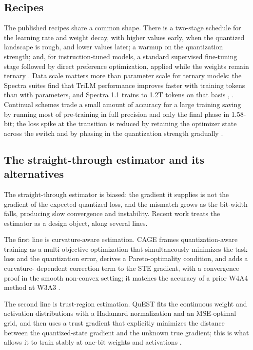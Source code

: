 \documentclass[11pt]{article}
\begin{document}
\subsection{Recipes}

The published recipes share a common shape. There is a two-stage schedule for the
learning rate and weight decay, with higher values early, when the quantized landscape
is rough, and lower values later; a warmup on the quantization strength; and, for
instruction-tuned models, a standard supervised fine-tuning stage followed by direct
preference optimization, applied while the weights remain ternary \cite{Ma2025-BitNet2B4T}.
Data scale matters more than parameter scale for ternary models: the Spectra suites
find that TriLM performance improves faster with training tokens than with parameters,
and Spectra 1.1 trains to 1.2T tokens on that basis \cite{Kaushal2024-Spectra},
\cite{Vaidhya2025-Spectra11}. Continual schemes trade a small amount of accuracy for a large
training saving by running most of pre-training in full precision and only the final
phase in 1.58-bit; the loss spike at the transition is reduced by retaining the
optimizer state across the switch and by phasing in the quantization strength gradually
\cite{Nielsen2025-ContinualQAT,Tu2025-Rethink1bitOpt}.

\subsection{The straight-through estimator and its alternatives}

The straight-through estimator is biased: the gradient it supplies is not the gradient
of the expected quantized loss, and the mismatch grows as the bit-width falls,
producing slow convergence and instability. Recent work treats the estimator as a
design object, along several lines.

The first line is curvature-aware estimation. CAGE frames quantization-aware training as
a multi-objective optimization that simultaneously minimizes the task loss and the
quantization error, derives a Pareto-optimality condition, and adds a curvature-
dependent correction term to the STE gradient, with a convergence proof in the smooth
non-convex setting; it matches the accuracy of a prior W4A4 method at W3A3
\cite{Tabesh2025-CAGE}.

The second line is trust-region estimation. QuEST fits the continuous weight and
activation distributions with a Hadamard normalization and an MSE-optimal grid, and then
uses a trust gradient that explicitly minimizes the distance between the quantized-state
gradient and the unknown true gradient; this is what allows it to train stably at
one-bit weights and activations \cite{Panferov2025-QuEST}.
\end{document}
